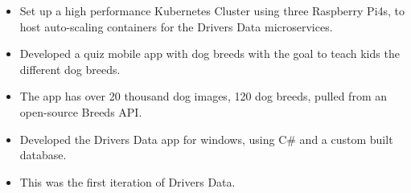 \documentclass[10pt,a4paper,ragged2e]{resume}
\begin{document}
\begin{fullwidth}
        \begin{itemize}
            \item Set up a high performance Kubernetes Cluster using three Raspberry Pi4s, to host auto-scaling containers for the Drivers Data microservices.
        \end{itemize}


        \newpage


        \begin{itemize}
            \item Developed a quiz mobile app with dog breeds with the goal to teach kids the different dog breeds.
            \item The app has over 20 thousand dog images, 120 dog breeds, pulled from an open-source Breeds API.
        \end{itemize}
        \divider

        \begin{itemize}
            \item Developed the Drivers Data app for windows, using C\# and a custom built database.
            \item This was the first iteration of Drivers Data.
        \end{itemize}
    \end{fullwidth}


    \clearpage\nocite{*}
\end{document}
